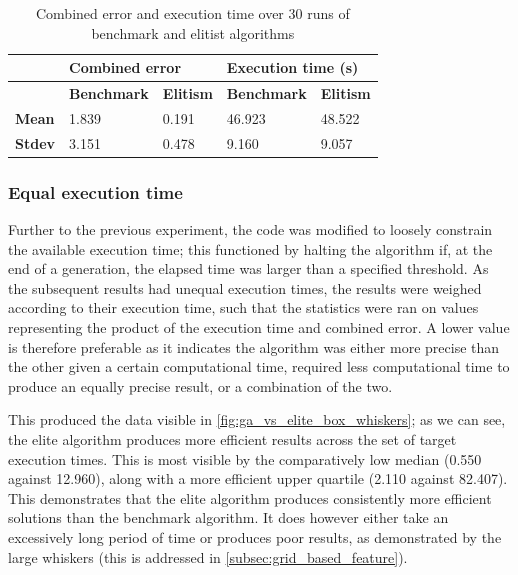 \documentclass[authoryearcitations]{UoYCSproject}
\begin{document}
\begin{table}
\centering
\begin{tabular}{|l|l|l|l|l|}
\hline & \multicolumn{2}{l|}{\textbf{Combined error}} & \multicolumn{2}{l|}{\textbf{Execution time (s)}} \\ \hline & 
\textbf{Benchmark} & \textbf{Elitism}& \textbf{Benchmark}   & \textbf{Elitism}  \\ \hline 
\textbf{Mean} & 1.839   & 0.191  & 46.923 & 48.522  \\ \hline
\textbf{Stdev}  & 3.151   & 0.478 & 9.160 & 9.057 \\ \hline
\end{tabular}
\caption[Effects of elitist against tournament selection (table)]{Combined error and execution time over 30 runs of benchmark and elitist algorithms}
\label{tab:ga_vs_elite_eq_pop_gen}
\end{table}

\subsubsection{Equal execution time}
\label{subsec:ga_vs_elite_time_sweep}
Further to the previous experiment, the code was modified to loosely constrain the available execution time; this functioned by halting the algorithm if, at the end of a generation, the elapsed time was larger than a specified threshold. As the subsequent results had unequal execution times, the results were weighed according to their execution time, such that the statistics were ran on values representing the product of the execution time and combined error. A lower value is therefore preferable as it indicates the algorithm was either more precise than the other given a certain computational time, required less computational time to produce an equally precise result, or a combination of the two. 

This produced the data visible in \autoref{fig:ga_vs_elite_box_whiskers}; as we can see, the elite algorithm produces more efficient results across the set of target execution times. This is most visible by the comparatively low median (0.550 against 12.960), along with a more efficient upper quartile (2.110 against 82.407). This demonstrates that the elite algorithm produces consistently more efficient solutions than the benchmark algorithm. It does however either take an excessively long period of time or produces poor results, as demonstrated by the large whiskers (this is addressed in \autoref{subsec:grid_based_feature}).
\end{document}
